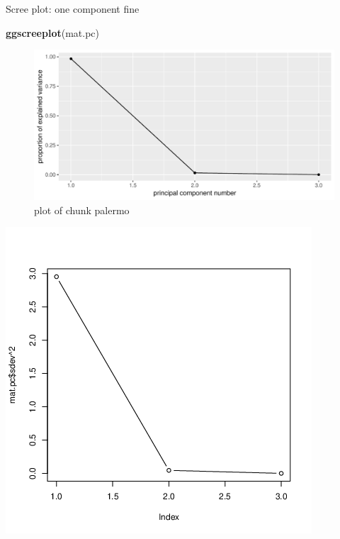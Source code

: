 \documentclass[ignorenonframetext,]{beamer}
\newenvironment{Shaded}{\begin{snugshade}}{\end{snugshade}}
\newcommand{\KeywordTok}[1]{\textcolor[rgb]{0.13,0.29,0.53}{\textbf{#1}}}
\newcommand{\NormalTok}[1]{#1}
\begin{document}
\begin{frame}[fragile]{Scree plot: one component fine}
\protect\hypertarget{scree-plot-one-component-fine}{}

\begin{Shaded}
\begin{Highlighting}[]
\KeywordTok{ggscreeplot}\NormalTok{(mat.pc)}
\end{Highlighting}
\end{Shaded}

\begin{figure}
\centering
\includegraphics{figure/palermo-1.pdf}
\caption{plot of chunk palermo}
\end{figure}

\includegraphics{bPrincomp-pc-cov.png}

\end{frame}
\end{document}
